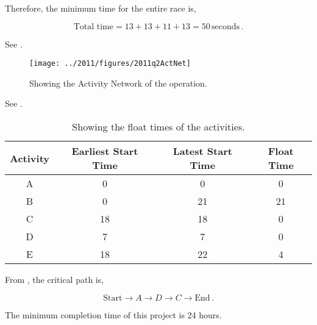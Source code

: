 \begin{subquestions}
Therefore, the minimum time for the entire race is,

\begin{equation}
	\text{Total time} = 13+13+11+13=50 \, \text{seconds}\,.	
\end{equation}


\subquestion

\begin{subsubquestions}
	
\subsubquestion

See .

\begin{figure}
	\begin{center}
		\texttt{[image: ../2011/figures/2011q2ActNet]}
		\caption{\label{2011:q2:fig:ActNet} Showing the Activity Network of the operation.}
	\end{center}
\end{figure}

\subsubquestion

See .

\begin{table}[ht]
	\centering
	\begin{tabular}{|c|c|c|c|}
		\hline
		Activity & Earliest Start Time & Latest Start Time & Float Time \\
		\hline
		A & 0 & 0 & 0 \\
		B & 0 & 21 & 21 \\
		C & 18 & 18 & 0 \\
		D & 7 & 7 & 0 \\
		E & 18 & 22 & 4 \\
		\hline
	\end{tabular}
	\caption{\label{2011:q2:tab:Table1} Showing the float times of the activities.}
\end{table}
	
	
\subsubquestion

\begin{subsubsubquestions}
	
\subsubsubquestion

From , the critical path is,

\begin{equation}
	\text{Start} \rightarrow A \rightarrow D \rightarrow C \rightarrow \text{End}\,.
\end{equation}

\subsubsubquestion

The minimum completion time of this project is 24 hours.

\end{subsubsubquestions}

\end{subsubquestions}

\end{subquestions}


